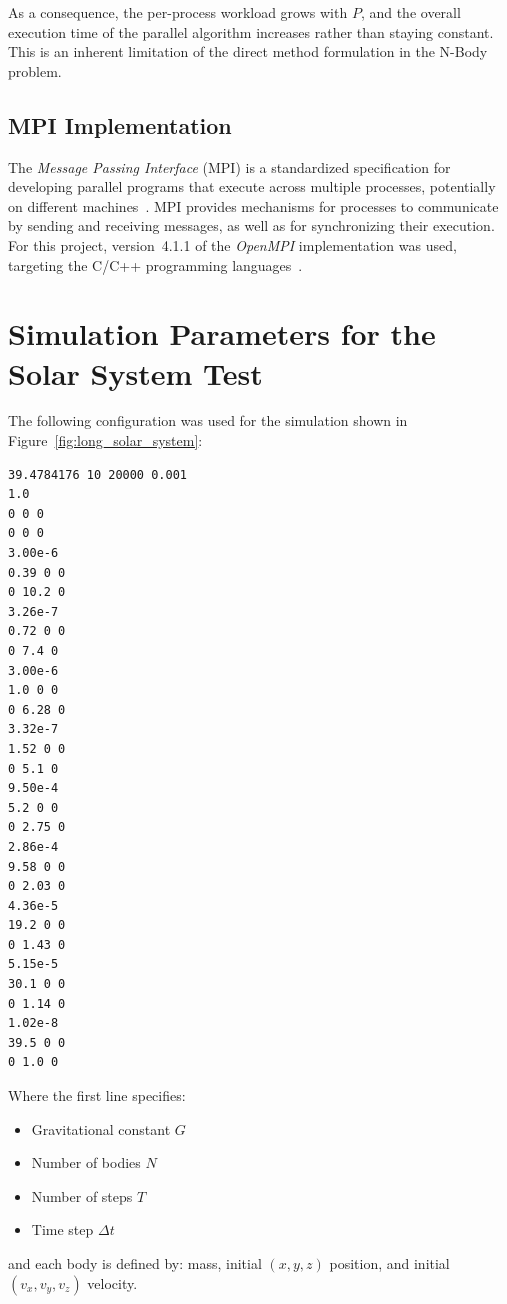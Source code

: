 \documentclass{article}
\begin{document}
As a consequence, the per-process workload grows with $P$, and the overall execution time of the parallel algorithm increases rather than staying constant.  
This is an inherent limitation of the direct method formulation in the N-Body problem.




\subsection{MPI Implementation}

The \emph{Message Passing Interface} (MPI) is a standardized specification for developing parallel programs that execute across multiple processes, potentially on different machines~\cite{mpi_standard}.
MPI provides mechanisms for processes to communicate by sending and receiving messages, as well as for synchronizing their execution.
For this project, version~4.1.1 of the \emph{OpenMPI} implementation was used, targeting the C/C++ programming languages~\cite{openmpi_docs}.




\appendix


\section[Simulation Parameters (Solar System)]{Simulation Parameters for the Solar System Test}
\label{appendix:solar_params}

The following configuration was used for the simulation shown in Figure~\ref{fig:long_solar_system}:

\begin{verbatim}
39.4784176 10 20000 0.001
1.0
0 0 0
0 0 0
3.00e-6
0.39 0 0
0 10.2 0
3.26e-7
0.72 0 0
0 7.4 0
3.00e-6
1.0 0 0
0 6.28 0
3.32e-7
1.52 0 0
0 5.1 0
9.50e-4
5.2 0 0
0 2.75 0
2.86e-4
9.58 0 0
0 2.03 0
4.36e-5
19.2 0 0
0 1.43 0
5.15e-5
30.1 0 0
0 1.14 0
1.02e-8
39.5 0 0
0 1.0 0
\end{verbatim}

Where the first line specifies:
\begin{itemize}
    \item Gravitational constant $G$
    \item Number of bodies $N$
    \item Number of steps $T$
    \item Time step $\Delta t$
\end{itemize}
and each body is defined by: mass, initial $(x, y, z)$ position, and initial $(v_x, v_y, v_z)$ velocity.
\end{document}
